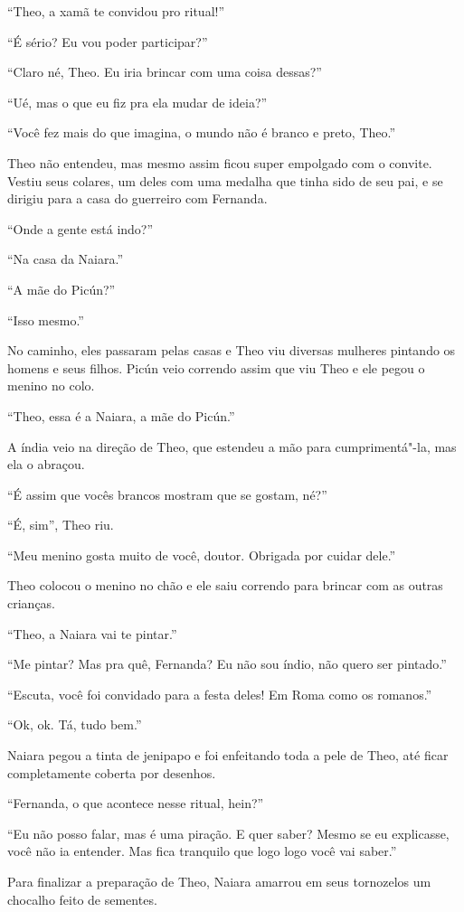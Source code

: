 ``Theo, a xamã te convidou pro ritual!''

``É sério? Eu vou poder participar?''

``Claro né, Theo. Eu iria brincar com uma coisa dessas?''

``Ué, mas o que eu fiz pra ela mudar de ideia?''

``Você fez mais do que imagina, o mundo não é branco e preto, Theo.''

Theo não entendeu, mas mesmo assim ficou super empolgado com o convite.
Vestiu seus colares, um deles com uma medalha que tinha sido de seu pai,
e se dirigiu para a casa do guerreiro com Fernanda.

``Onde a gente está indo?''

``Na casa da Naiara.''

``A mãe do Picún?''

``Isso mesmo.''

No caminho, eles passaram pelas casas e Theo viu diversas mulheres
pintando os homens e seus filhos. Picún veio correndo assim que viu Theo
e ele pegou o menino no colo.

``Theo, essa é a Naiara, a mãe do Picún.''

A índia veio na direção de Theo, que estendeu a mão para cumprimentá"-la,
mas ela o abraçou.

``É assim que vocês brancos mostram que se gostam, né?''

``É, sim'', Theo riu.

``Meu menino gosta muito de você, doutor. Obrigada por cuidar dele.''

Theo colocou o menino no chão e ele saiu correndo para brincar com as
outras crianças.

``Theo, a Naiara vai te pintar.''

``Me pintar? Mas pra quê, Fernanda? Eu não sou índio, não quero ser
pintado.''

``Escuta, você foi convidado para a festa deles! Em Roma como os
romanos.''

``Ok, ok. Tá, tudo bem.''

Naiara pegou a tinta de jenipapo e foi enfeitando toda a pele de Theo,
até ficar completamente coberta por desenhos.

``Fernanda, o que acontece nesse ritual, hein?''

``Eu não posso falar, mas é uma piração. E quer saber? Mesmo se eu
explicasse, você não ia entender. Mas fica tranquilo que logo logo você
vai saber.''

Para finalizar a preparação de Theo, Naiara amarrou em seus tornozelos
um chocalho feito de sementes.

